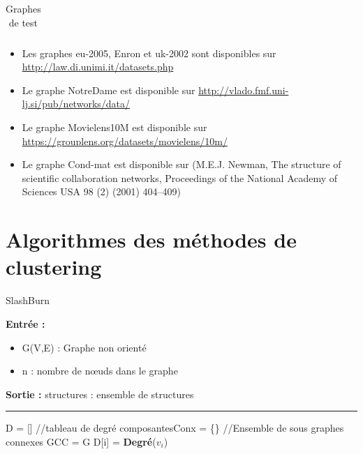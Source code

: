\documentclass[a4paper,oneside,12pt]{report}
\theoremstyle{definition}
\begin{document}
\begin{appendix}
\begin{table}[H]
\begin{tabular}{|C{5cm}|C{4.5cm}|C{4.5cm}|}
\end{tabular}
									\caption{Graphes de test}									\label{comgen}

 								\end{table}



\begin{itemize}

\item Les graphes eu-2005, Enron et uk-2002 sont disponibles sur \url{http://law.di.unimi.it/datasets.php}

\item Le graphe NotreDame est disponible sur \url{http://vlado.fmf.uni-lj.si/pub/networks/data/}

\item Le graphe Movielens10M est disponible sur \url{https://grouplens.org/datasets/movielens/10m/}

\item Le graphe Cond-mat  est disponible sur (M.E.J. Newman, The structure of scientific collaboration networks, Proceedings of the National Academy of Sciences USA 98 (2) (2001) 404–409)
\end{itemize}






\newpage


\chapter{Algorithmes des méthodes de clustering}

\label{SlashBurn}

\begin{algorithm}[H]
					\label{alg:SlashBurn}
					\caption{SlashBurn}
					\textbf{Entrée :}
						\begin{itemize}[label=$\bullet$]
							\item G(V,E) : Graphe non orienté 
							\item n : nombre de nœuds dans le graphe 
							
						\end{itemize}
					\textbf{Sortie :} structures : ensemble de structures\\							\noindent\rule{\textwidth}{1pt}
						
						
				\begin{algorithmic} [1]
				
				 \STATE D = [] //tableau de degré
				 \STATE composantesConx = \{\} //Ensemble de sous graphes connexes
				 \STATE GCC = G			 
				 \STATE D[i] = \textbf{Degré}($v_i$)
				 \ENDFOR
				 

\end{algorithmic}
\end{algorithm}
\end{appendix}
\end{document}
